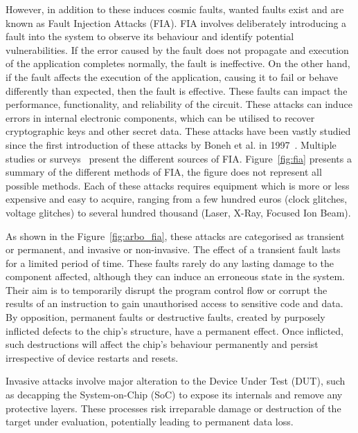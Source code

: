 However, in addition to these induces cosmic faults, wanted faults exist and are known as Fault Injection Attacks (FIA). FIA involves deliberately introducing a fault into the system to observe its behaviour and identify potential vulnerabilities. If the error caused by the fault does not propagate and execution of the application completes normally, the fault is ineffective. On the other hand, if the fault affects the execution of the application, causing it to fail or behave differently than expected, then the fault is effective. These faults can impact the performance, functionality, and reliability of the circuit. These attacks can induce errors in internal electronic components, which can be utilised to recover cryptographic keys and other secret data.
These attacks have been vastly studied since the first introduction of these attacks by Boneh et al. in 1997~\cite{BDL-97-eurocrypt,BDL-01-crypto}. Multiple studies or surveys~\cite{ZAV-06-jarab, BCNTW-06-procieee, CKNDCTD-21-compsec, PBR-15-dtis, YSW-18-hss, BH-22-access} present the different sources of FIA.
Figure~\ref{fig:fia} presents a summary of the different methods of FIA, the figure does not represent all possible methods. Each of these attacks requires equipment which is more or less expensive and easy to acquire, ranging from a few hundred euros (clock glitches, voltage glitches) to several hundred thousand (Laser, X-Ray, Focused Ion Beam).

As shown in the Figure~\ref{fig:arbo_fia}, these attacks are categorised as transient or permanent, and invasive or non-invasive.
The effect of a transient fault lasts for a limited period of time. These faults rarely do any lasting damage to the component affected, although they can induce an erroneous state in the system. Their aim is to temporarily disrupt the program control flow or corrupt the results of an instruction to gain unauthorised access to sensitive code and data.
By opposition, permanent faults or destructive faults, created by purposely inflicted defects to the chip’s structure, have a permanent effect. Once inflicted, such destructions will affect the chip’s behaviour permanently and persist irrespective of device restarts and resets.

Invasive attacks involve major alteration to the Device Under Test (DUT), such as decapping the System-on-Chip (SoC) to expose its internals and remove any protective layers. These processes risk irreparable damage or destruction of the target under evaluation, potentially leading to permanent data loss.


